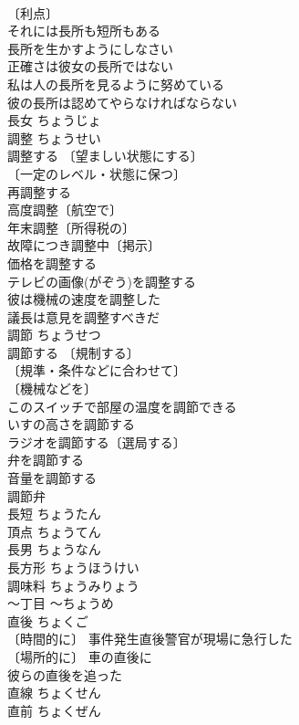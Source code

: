 \documentclass[8pt]{extreport}
\begin{document}
\begin{CJK}{UTF8}{min}
\\	〔利点〕
\\	それには長所も短所もある 
\\	長所を生かすようにしなさい 
\\	正確さは彼女の長所ではない 
\\	私は人の長所を見るように努めている 
\\	彼の長所は認めてやらなければならない 
\\	長女	ちょうじょ	
\\	調整	ちょうせい	
\\	調整する 〔望ましい状態にする〕
\\	〔一定のレベル・状態に保つ〕
\\	再調整する 
\\	高度調整〔航空で〕 
\\	年末調整〔所得税の〕 
\\	故障につき調整中〔掲示〕 
\\	価格を調整する 
\\	テレビの画像(がぞう)を調整する 
\\	彼は機械の速度を調整した 
\\	議長は意見を調整すべきだ 
\\	調節	ちょうせつ	
\\	調節する 〔規制する〕
\\	〔規準・条件などに合わせて〕
\\	〔機械などを〕
\\	このスイッチで部屋の温度を調節できる 
\\	いすの高さを調節する 
\\	ラジオを調節する〔選局する〕 
\\	弁を調節する 
\\	音量を調節する 
\\	調節弁 
\\	長短	ちょうたん	
\\	頂点	ちょうてん	
\\	長男	ちょうなん	
\\	長方形	ちょうほうけい	
\\	調味料	ちょうみりょう	
\\	～丁目	～ちょうめ	
\\	直後	ちょくご	
\\	〔時間的に〕 事件発生直後警官が現場に急行した 
\\	〔場所的に〕 車の直後に 
\\	彼らの直後を追った 
\\	直線	ちょくせん	
\\	直前	ちょくぜん	

\end{CJK}
\end{document}
